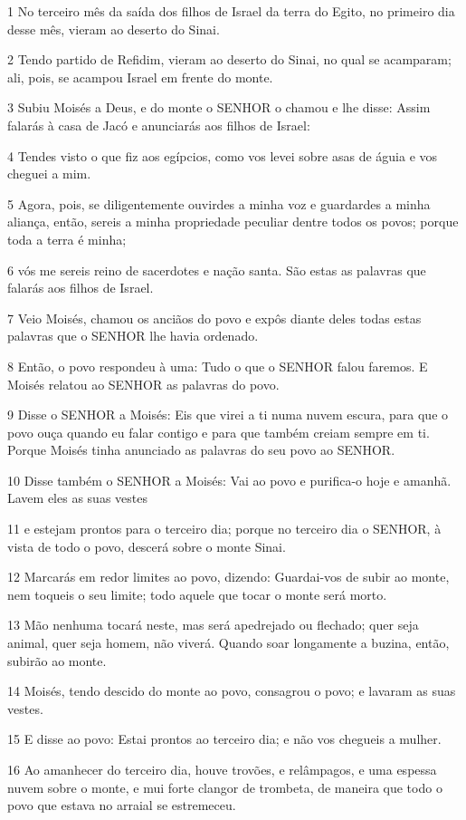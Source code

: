 \par 1 No terceiro mês da saída dos filhos de Israel da terra do Egito, no primeiro dia desse mês, vieram ao deserto do Sinai.
\par 2 Tendo partido de Refidim, vieram ao deserto do Sinai, no qual se acamparam; ali, pois, se acampou Israel em frente do monte.
\par 3 Subiu Moisés a Deus, e do monte o SENHOR o chamou e lhe disse: Assim falarás à casa de Jacó e anunciarás aos filhos de Israel:
\par 4 Tendes visto o que fiz aos egípcios, como vos levei sobre asas de águia e vos cheguei a mim.
\par 5 Agora, pois, se diligentemente ouvirdes a minha voz e guardardes a minha aliança, então, sereis a minha propriedade peculiar dentre todos os povos; porque toda a terra é minha;
\par 6 vós me sereis reino de sacerdotes e nação santa. São estas as palavras que falarás aos filhos de Israel.
\par 7 Veio Moisés, chamou os anciãos do povo e expôs diante deles todas estas palavras que o SENHOR lhe havia ordenado.
\par 8 Então, o povo respondeu à uma: Tudo o que o SENHOR falou faremos. E Moisés relatou ao SENHOR as palavras do povo.
\par 9 Disse o SENHOR a Moisés: Eis que virei a ti numa nuvem escura, para que o povo ouça quando eu falar contigo e para que também creiam sempre em ti. Porque Moisés tinha anunciado as palavras do seu povo ao SENHOR.
\par 10 Disse também o SENHOR a Moisés: Vai ao povo e purifica-o hoje e amanhã. Lavem eles as suas vestes
\par 11 e estejam prontos para o terceiro dia; porque no terceiro dia o SENHOR, à vista de todo o povo, descerá sobre o monte Sinai.
\par 12 Marcarás em redor limites ao povo, dizendo: Guardai-vos de subir ao monte, nem toqueis o seu limite; todo aquele que tocar o monte será morto.
\par 13 Mão nenhuma tocará neste, mas será apedrejado ou flechado; quer seja animal, quer seja homem, não viverá. Quando soar longamente a buzina, então, subirão ao monte.
\par 14 Moisés, tendo descido do monte ao povo, consagrou o povo; e lavaram as suas vestes.
\par 15 E disse ao povo: Estai prontos ao terceiro dia; e não vos chegueis a mulher.
\par 16 Ao amanhecer do terceiro dia, houve trovões, e relâmpagos, e uma espessa nuvem sobre o monte, e mui forte clangor de trombeta, de maneira que todo o povo que estava no arraial se estremeceu.

